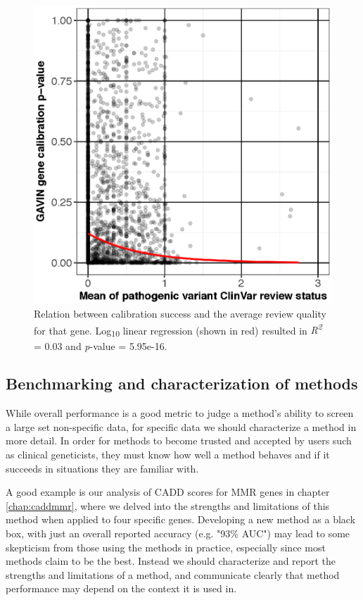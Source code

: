 \begin{figure}
\centering
\includegraphics[scale=0.8]{img/discussion_reviewstatusvspvalue}
\caption[Relation between calibration and review quality]{Relation between calibration success and the average review quality for that gene. Log\textsubscript{10} linear regression (shown in red) resulted in \textsl{R\textsuperscript{2}} = 0.03 and \textsl{p}-value = 5.95e-16.}
\label{fig:discussion_reviewstatusvspvalue}
\end{figure}

\subsection{Benchmarking and characterization of methods} \label{methodsection_benchmarking}

While overall performance is a good metric to judge a method's ability to screen a large set non-specific data, for specific data we should characterize a method in more detail.
In order for methods to become trusted and accepted by users such as clinical geneticists, they must know how well a method behaves and if it succeeds in situations they are familiar with.

A good example is our analysis of CADD scores for MMR genes in chapter \ref{chap:caddmmr}, where we delved into the strengths and limitations of this method when applied to four specific genes.
Developing a new method as a black box, with just an overall reported accuracy (e.g. "93\% AUC") may lead to some skepticism from those using the methods in practice, especially since most methods claim to be the best.
Instead we should characterize and report the strengths and limitations of a method, and communicate clearly that method performance may depend on the context it is used in.

